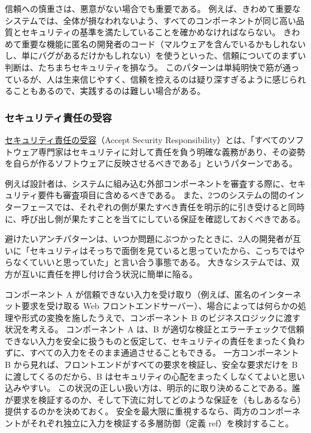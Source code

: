 \documentclass[uplatex]{jsarticle}
\def\ref#1{ref}%
\def\label#1{}%
\begin{document}
信頼への慎重さは、悪意がない場合でも重要である。
例えば、きわめて重要なシステムでは、全体が損なわれないよう、すべてのコンポーネントが同じ高い品質とセキュリティの基準を満たしていることを確かめなければならない。
きわめて重要な機能に匿名の開発者のコード（マルウェアを含んでいるかもしれないし、単にバグがあるだけかもしれない）を使うといった、信頼についてのまずい判断は、たちまちセキュリティを損なう。
このパターンは単純明快で筋が通っているが、人は生来信じやすく、信頼を控えるのは疑り深すぎるように感じられることもあるので、実践するのは難しい場合がある。

\subsubsection{セキュリティ責任の受容}

\begin{dfn}[セキュリティ責任の受容]\label{dfn:ch4-accept-security-responsibility}
\underline{セキュリティ責任の受容}（Accept Security Responsibility）とは、「すべてのソフトウェア専門家はセキュリティに対して責任を負う明確な義務があり、その姿勢を自らが作るソフトウェアに反映させるべきである」というパターンである。
\end{dfn}

例えば設計者は、システムに組み込む外部コンポーネントを審査する際に、セキュリティ要件も審査項目に含めるべきである。
また、2つのシステムの間のインターフェースでは、それぞれの側が果たすべき責任を明示的に引き受けると同時に、呼び出し側が果たすことを当てにしている保証を確認しておくべきである。

避けたいアンチパターンは、いつか問題にぶつかったときに、2人の開発者が互いに「セキュリティはそっちで面倒を見ていると思っていたから、こっちではやらなくていいと思っていた」と言い合う事態である。
大きなシステムでは、双方が互いに責任を押し付け合う状況に簡単に陥る。

\begin{exa}[フロントエンドとビジネスロジックの責任の空白]\label{exa:ch4-responsibility-gap}
コンポーネント A が信頼できない入力を受け取り（例えば、匿名のインターネット要求を受け取る Web フロントエンドサーバー）、場合によっては何らかの処理や形式の変換を施したうえで、コンポーネント B のビジネスロジックに渡す状況を考える。
コンポーネント A は、B が適切な検証とエラーチェックで信頼できない入力を安全に扱うものと仮定して、セキュリティの責任をまったく負わずに、すべての入力をそのまま通過させることもできる。
一方コンポーネント B から見れば、フロントエンドがすべての要求を検証し、安全な要求だけを B に渡してくるのだから、B はセキュリティの心配をまったくしなくてよいと思い込みやすい。
この状況の正しい扱い方は、明示的に取り決めることである。誰が要求を検証するのか、そして下流に対してどのような保証を（もしあるなら）提供するのかを決めておく。
安全を最大限に重視するなら、両方のコンポーネントがそれぞれ独立に入力を検証する多層防御（定義 \ref{dfn:ch4-defense-in-depth}）を検討すること。
\end{exa}
\end{document}
